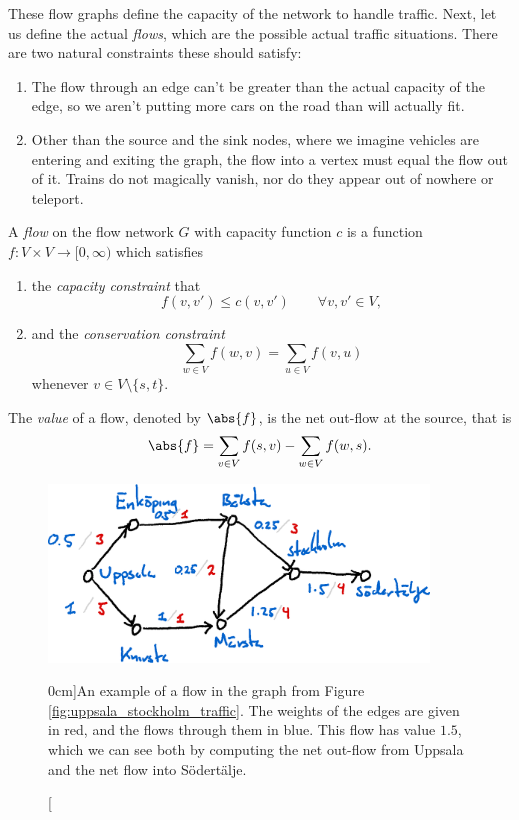 \documentclass[nobib]{tufte-handout}
\begin{document}
  These flow graphs define the capacity of the network to handle traffic. Next, let us define the actual \emph{flows}, which are the possible actual traffic situations. There are two natural constraints these should satisfy:
  \begin{enumerate}
    \item The flow through an edge can't be greater than the actual capacity of the edge, so we aren't putting more cars on the road than will actually fit.
    \item Other than the source and the sink nodes, where we imagine vehicles are entering and exiting the graph, the flow into a vertex must equal the flow out of it. Trains do not magically vanish, nor do they appear out of nowhere or teleport.
  \end{enumerate}

  \begin{definition}
    A \emph{flow} on the flow network $G$ with capacity function $c$ is a function $f: V \times V \to [0,\infty)$ which satisfies
    \begin{enumerate}
        \item the \emph{capacity constraint} that
        $$f(v, v') \leq c(v, v')\qquad \forall v, v' \in V,$$
        \item and the \emph{conservation constraint}
        $$\sum_{w \in V} f(w, v) = \sum_{u \in V} f(v, u)$$
        whenever $v \in V \setminus \{s,t\}$.
    \end{enumerate}

    The \emph{value} of a flow, denoted by $\abs{f}$, is the net out-flow at the source, that is
    $$\abs{f} = \sum_{v \in V} f(s, v) - \sum_{w \in V} f(w, s).$$
\end{definition}

\begin{figure}
    \centering
    \includegraphics[width=0.9\textwidth]{graphics/L7_flows/flow.png}
    \caption[][0cm]{An example of a flow in the graph from Figure \ref{fig:uppsala_stockholm_traffic}. The weights of the edges are given in red, and the flows through them in blue. This flow has value $1.5$, which we can see both by computing the net out-flow from Uppsala and the net flow into Södertälje.}
    \label{fig:flow}
\end{figure}
\end{document}
